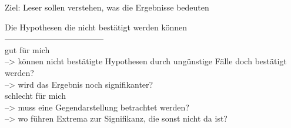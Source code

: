 Ziel: Leser sollen verstehen, was die Ergebnisse bedeuten

\noindent
Die Hypothesen die nicht bestätigt werden können\\
------------------------------------\\
gut für mich\\
--> können nicht bestätigte Hypothesen durch ungünstige Fälle doch bestätigt werden?\\
--> wird das Ergebnis noch signifikanter?\\
schlecht für mich\\
--> muss eine Gegendarstellung betrachtet werden?\\
--> wo führen Extrema zur Signifikanz, die sonst nicht da ist?\\
